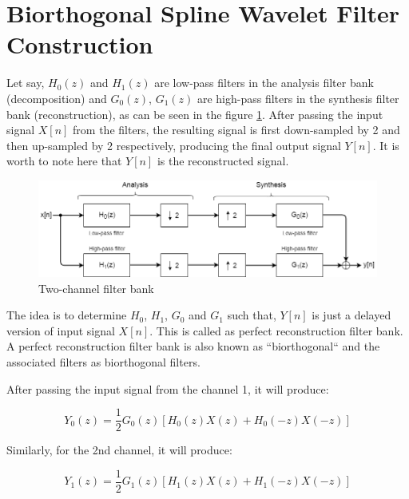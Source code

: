 \section{Biorthogonal Spline Wavelet Filter Construction}
Let say, ${H_{0}(z)}$ and ${H_{1}(z)}$ are low-pass filters in the analysis filter bank (decomposition) and ${G_{0}(z)}$, ${G_{1}(z)}$ are high-pass filters in the synthesis filter bank (reconstruction), as can be seen in the figure \ref{fig:2_channel_filter_bank}. After passing the input signal $X[n]$ from the filters, the resulting signal is first down-sampled by 2 and then up-sampled by 2  respectively, producing the final output signal $Y[n]$. It is worth to note here that $Y[n]$ is the reconstructed signal. 



\begin{figure}
	\centering
	\includegraphics[width=160mm]{images/2_channel_filter_bank}
	\caption{Two-channel filter bank}
	\label{fig:2_channel_filter_bank}
\end{figure}



The idea is to determine $H_0$, $H_1$, $G_0$ and $G_1$ such that, $Y[n]$ is just a delayed version of input signal $X[n]$. This is called as perfect reconstruction filter bank. A perfect reconstruction filter bank is also known as ``biorthogonal`` and the associated filters as biorthogonal filters. 

After passing the input signal from the channel 1, it will produce:

\begin{equation} \label{eqn_wavelet_transform}
{Y_{0}(z) = \frac{1}{2}G_{0}(z)[H_{0}(z)X(z) + H_{0}(-z)X(-z)]}
\end{equation}

Similarly, for the 2nd channel, it will produce:


\begin{equation} \label{eqn_wavelet_transform}
{Y_{1}(z) = \frac{1}{2}G_{1}(z)[H_{1}(z)X(z) + H_{1}(-z)X(-z)]}
\end{equation}

